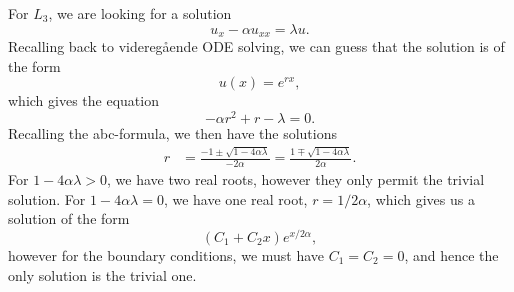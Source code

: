 \begin{solution}{4.6}
    For $L_3$, we are looking for a solution
    \begin{equation}
        u_x - \alpha u_{xx} = \lambda u.
    \end{equation}
    Recalling back to videregående ODE solving, we can guess that the solution is of the form
    \begin{equation}
        u(x) = e^{rx},
    \end{equation}
    which gives the equation
    \begin{equation}
        -\alpha r^2 + r - \lambda = 0.
    \end{equation}
    Recalling the abc-formula, we then have the solutions
    \begin{align}
        r &=
        \frac{-1 \pm \sqrt{1 - 4 \alpha \lambda}}{-2 \alpha}
        = \frac{1 \mp \sqrt{1 - 4 \alpha \lambda}}{2 \alpha}.
    \end{align}
    For $1 - 4 \alpha \lambda > 0$, we have two real roots, however they only permit the trivial solution.
    For $1 - 4 \alpha \lambda = 0$, we have one real root, $r = 1 / 2\alpha$, which gives us a solution of the form
    \begin{equation}
        (C_1 + C_2 x) e^{x / 2\alpha},
    \end{equation}
    however for the boundary conditions, we must have $C_1 = C_2 = 0$, and hence the only solution is the trivial one.


\end{solution}
